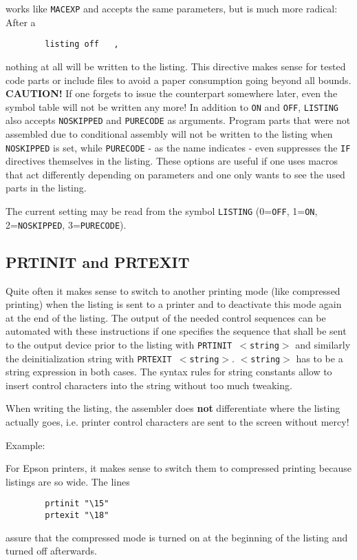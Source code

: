 \documentclass[12pt,twoside]{report}
\makeatletter
\newcommand{\bb}[1]{{\bf #1}}
\newcommand{\tty}[1]{{\tt #1}}
\newcommand{\ttindex}[1]{\index{#1@{\tt #1}}}
\makeatother
\begin{document}
works like \tty{MACEXP} and accepts the same parameters, but is much more
radical: After a
\begin{verbatim}
        listing off   ,
\end{verbatim}
nothing at all will be written to the listing.  This directive makes sense
for tested code parts or include files to avoid a paper consumption going
beyond all bounds.  \bb{CAUTION!} If one forgets to issue the counterpart
somewhere later, even the symbol table will not be written any more!  In
addition to \tty{ON} and \tty{OFF}, \tty{LISTING} also accepts
\tty{NOSKIPPED} and \tty{PURECODE} as arguments.  Program parts that were
not assembled due to conditional assembly will not be written to the
listing when \tty{NOSKIPPED} is set, while \tty{PURECODE} - as the name
indicates - even suppresses the \tty{IF} directives themselves in the
listing.  These options are useful if one uses macros that act differently
depending on parameters and one only wants to see the used parts in the
listing.

The current setting may be read from the symbol \tty{LISTING} (0=\tty{OFF},
1=\tty{ON}, 2=\tty{NOSKIPPED}, 3=\tty{PURECODE}).


\subsection{PRTINIT and PRTEXIT}
\ttindex{PRTINIT}\ttindex{PRTEXIT}

Quite often it makes sense to switch to another printing mode (like
compressed printing) when the listing is sent to a printer and to
deactivate this mode again at the end of the listing.  The output of
the needed control sequences can be automated with these instructions
if one specifies the sequence that shall be sent to the output device
prior to the listing with \tty{PRTINIT $<$string$>$} and similarly the
deinitialization string with \tty{PRTEXIT $<$string$>$}.
\tty{$<$string$>$} has to be a string expression in both cases.  The syntax
rules for string constants allow to insert control characters into the
string without too much tweaking.

When writing the listing, the assembler does \bb{not} differentiate where
the listing actually goes, i.e. printer control characters are sent to the
screen without mercy!

Example:

For Epson printers, it makes sense to switch them to compressed
printing because listings are so wide.  The lines
\begin{verbatim}
        prtinit "\15"
        prtexit "\18"
\end{verbatim}
assure that the compressed mode is turned on at the beginning of the
listing and turned off afterwards.
\end{document}
